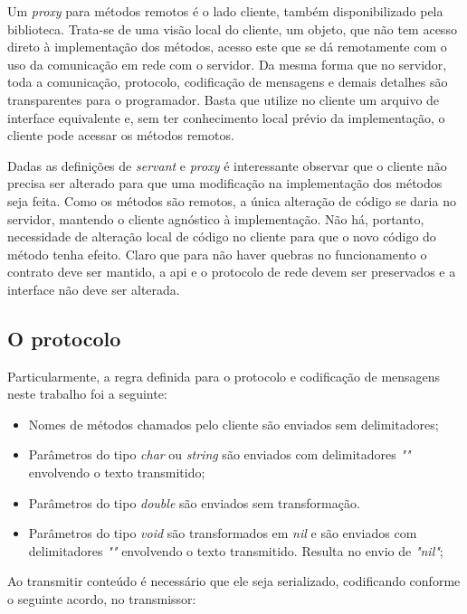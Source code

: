 \documentclass[11pt]{article}
\begin{document}
Um \textit{proxy} para métodos remotos é o lado cliente, também disponibilizado
pela biblioteca. Trata-se de uma visão local do cliente, um objeto, que não tem
acesso direto à implementação dos métodos, acesso este que se dá remotamente com
o uso da comunicação em rede com o servidor. Da mesma forma que no servidor,
toda a comunicação, protocolo, codificação de mensagens e demais detalhes são
transparentes para o programador. Basta que utilize no cliente um arquivo de
interface equivalente e, sem ter conhecimento local prévio da implementação, o
cliente pode acessar os métodos remotos.

Dadas as definições de \textit{servant} e \textit{proxy} é interessante observar
que o cliente não precisa ser alterado para que uma modificação na implementação
dos métodos seja feita. Como os métodos são remotos, a única alteração de código
se daria no servidor, mantendo o cliente agnóstico à implementação. Não há,
portanto, necessidade de alteração local de código no cliente para que o novo
código do método tenha efeito. Claro que para não haver quebras no funcionamento
o contrato deve ser mantido, a \gls{api} e o protocolo de rede devem ser
preservados e a interface não deve ser alterada.

\subsection{O protocolo}\label{subsec:proto}

Particularmente, a regra definida para o protocolo e codificação de mensagens
neste trabalho foi a seguinte:

\begin{itemize}
\item
Nomes de métodos chamados pelo cliente são enviados sem delimitadores;
\item
Parâmetros do tipo \textit{char} ou \textit{string} são enviados com delimitadores
\textit{""} envolvendo o texto transmitido;
\item
Parâmetros do tipo \textit{double} são enviados sem transformação.
\item
Parâmetros do tipo \textit{void} são transformados em \textit{nil} e são enviados
com delimitadores \textit{""} envolvendo o texto transmitido. Resulta no envio
de \textit{"nil"};
\end{itemize}

Ao transmitir conteúdo é necessário que ele seja serializado, codificando
conforme o seguinte acordo, no transmissor:
\end{document}
